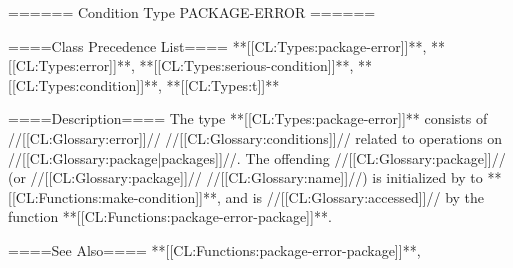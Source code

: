 ====== Condition Type PACKAGE-ERROR ======

====Class Precedence List==== **[[CL:Types:package-error]]**, **[[CL:Types:error]]**, **[[CL:Types:serious-condition]]**, **[[CL:Types:condition]]**, **[[CL:Types:t]]**

====Description====
The type **[[CL:Types:package-error]]** consists of //[[CL:Glossary:error]]// //[[CL:Glossary:conditions]]// related to operations on //[[CL:Glossary:package|packages]]//. The offending //[[CL:Glossary:package]]// (or //[[CL:Glossary:package]]// //[[CL:Glossary:name]]//) is initialized by  to **[[CL:Functions:make-condition]]**, and is //[[CL:Glossary:accessed]]// by the function **[[CL:Functions:package-error-package]]**.

====See Also====
**[[CL:Functions:package-error-package]]**, {\secref\Conditions}

